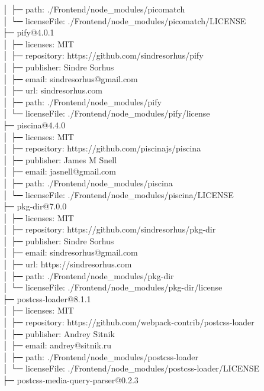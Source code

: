 │  ├─ path: ./Frontend/node\_modules/picomatch\\
│  └─ licenseFile: ./Frontend/node\_modules/picomatch/LICENSE\\
├─ pify@4.0.1\\
│  ├─ licenses: MIT\\
│  ├─ repository: https://github.com/sindresorhus/pify\\
│  ├─ publisher: Sindre Sorhus\\
│  ├─ email: sindresorhus@gmail.com\\
│  ├─ url: sindresorhus.com\\
│  ├─ path: ./Frontend/node\_modules/pify\\
│  └─ licenseFile: ./Frontend/node\_modules/pify/license\\
├─ piscina@4.4.0\\
│  ├─ licenses: MIT\\
│  ├─ repository: https://github.com/piscinajs/piscina\\
│  ├─ publisher: James M Snell\\
│  ├─ email: jasnell@gmail.com\\
│  ├─ path: ./Frontend/node\_modules/piscina\\
│  └─ licenseFile: ./Frontend/node\_modules/piscina/LICENSE\\
├─ pkg-dir@7.0.0\\
│  ├─ licenses: MIT\\
│  ├─ repository: https://github.com/sindresorhus/pkg-dir\\
│  ├─ publisher: Sindre Sorhus\\
│  ├─ email: sindresorhus@gmail.com\\
│  ├─ url: https://sindresorhus.com\\
│  ├─ path: ./Frontend/node\_modules/pkg-dir\\
│  └─ licenseFile: ./Frontend/node\_modules/pkg-dir/license\\
├─ postcss-loader@8.1.1\\
│  ├─ licenses: MIT\\
│  ├─ repository: https://github.com/webpack-contrib/postcss-loader\\
│  ├─ publisher: Andrey Sitnik\\
│  ├─ email: andrey@sitnik.ru\\
│  ├─ path: ./Frontend/node\_modules/postcss-loader\\
│  └─ licenseFile: ./Frontend/node\_modules/postcss-loader/LICENSE\\
├─ postcss-media-query-parser@0.2.3\\
